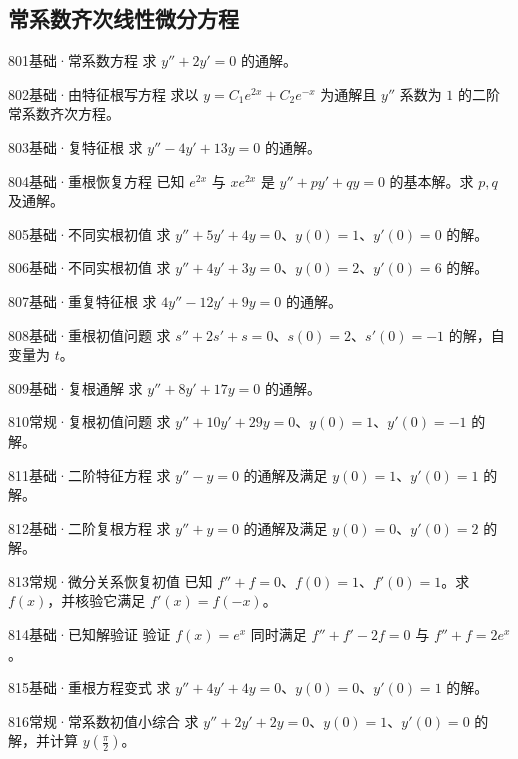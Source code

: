 \subsection{常系数齐次线性微分方程}
\begin{exercise}{801}{基础·常系数方程}
求 $y''+2y'=0$ 的通解。
\end{exercise}
\begin{exercise}{802}{基础·由特征根写方程}
求以 $y=C_1e^{2x}+C_2e^{-x}$ 为通解且 $y''$ 系数为 $1$ 的二阶常系数齐次方程。
\end{exercise}
\begin{exercise}{803}{基础·复特征根}
求 $y''-4y'+13y=0$ 的通解。
\end{exercise}
\begin{exercise}{804}{基础·重根恢复方程}
已知 $e^{2x}$ 与 $xe^{2x}$ 是 $y''+py'+qy=0$ 的基本解。求 $p,q$ 及通解。
\end{exercise}
\begin{exercise}{805}{基础·不同实根初值}
求 $y''+5y'+4y=0$、$y(0)=1$、$y'(0)=0$ 的解。
\end{exercise}
\begin{exercise}{806}{基础·不同实根初值}
求 $y''+4y'+3y=0$、$y(0)=2$、$y'(0)=6$ 的解。
\end{exercise}
\begin{exercise}{807}{基础·重复特征根}
求 $4y''-12y'+9y=0$ 的通解。
\end{exercise}
\begin{exercise}{808}{基础·重根初值问题}
求 $s''+2s'+s=0$、$s(0)=2$、$s'(0)=-1$ 的解，自变量为 $t$。
\end{exercise}
\begin{exercise}{809}{基础·复根通解}
求 $y''+8y'+17y=0$ 的通解。
\end{exercise}
\begin{exercise}{810}{常规·复根初值问题}
求 $y''+10y'+29y=0$、$y(0)=1$、$y'(0)=-1$ 的解。
\end{exercise}
\begin{exercise}{811}{基础·二阶特征方程}
求 $y''-y=0$ 的通解及满足 $y(0)=1$、$y'(0)=1$ 的解。
\end{exercise}
\begin{exercise}{812}{基础·二阶复根方程}
求 $y''+y=0$ 的通解及满足 $y(0)=0$、$y'(0)=2$ 的解。
\end{exercise}
\begin{exercise}{813}{常规·微分关系恢复初值}
已知 $f''+f=0$、$f(0)=1$、$f'(0)=1$。求 $f(x)$，并核验它满足 $f'(x)=f(-x)$。
\end{exercise}
\begin{exercise}{814}{基础·已知解验证}
验证 $f(x)=e^x$ 同时满足 $f''+f'-2f=0$ 与 $f''+f=2e^x$。
\end{exercise}
\begin{exercise}{815}{基础·重根方程变式}
求 $y''+4y'+4y=0$、$y(0)=0$、$y'(0)=1$ 的解。
\end{exercise}
\begin{exercise}{816}{常规·常系数初值小综合}
求 $y''+2y'+2y=0$、$y(0)=1$、$y'(0)=0$ 的解，并计算 $y(\frac{\pi}{2})$。
\end{exercise}

